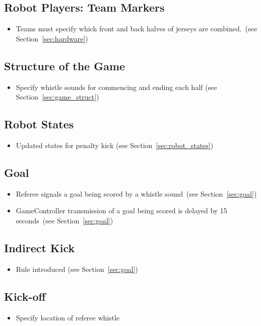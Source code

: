 \documentclass[12pt]{article}
\newcommand{\cf}{see\xspace}
\newcommand{\GoalScoredDelay}{15 seconds\xspace}
\begin{document}
\subsection*{Robot Players: Team Markers}
\begin{itemize}
  \item Teams must specify which front and back halves of jerseys are combined.~(\cf Section~\ref{sec:hardware})
\end{itemize}

\subsection*{Structure of the Game}
\begin{itemize}
  \item Specify whistle sounds for commencing and ending each half (\cf Section~\ref{sec:game_struct})
\end{itemize}

\subsection*{Robot States}
\begin{itemize}
  \item Updated states for penalty kick (\cf Section~\ref{sec:robot_states})
\end{itemize}

\subsection*{Goal}
\begin{itemize}
  \item Referee signals a goal being scored by a whistle sound~(\cf Section~\ref{sec:goal})
  \item GameController transmission of a goal being scored is delayed by \GoalScoredDelay~(\cf Section~\ref{sec:goal})
\end{itemize}

\subsection*{Indirect Kick}
\begin{itemize}
  \item Rule introduced (\cf Section~\ref{sec:goal})
\end{itemize}

\subsection*{Kick-off}
\begin{itemize}
  \item Specify location of referee whistle
\end{itemize}
\end{document}

